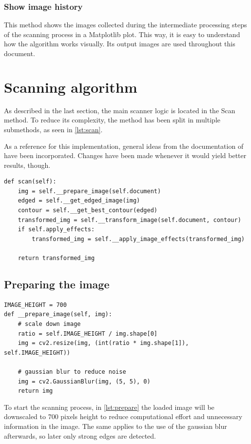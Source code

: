 \subsubsection*{Show image history}
This method shows the images collected during the intermediate processing steps of the scanning process in a Matplotlib plot. This way, it is easy to understand how the algorithm works visually. Its output images are used throughout this document.

\section{Scanning algorithm}
\label{main_logic}

As described in the last section, the main scanner logic is located in the Scan method. To reduce its complexity, the method has been split in multiple submethods, as seen in \autoref{lst:scan}.

As a reference for this implementation, general ideas from the documentation of \cite{scanner} have been incorporated. Changes have been made whenever it would yield better results, though.

\begin{lstlisting}[caption={Scan method}, label={lst:scan}]
def scan(self):
    img = self.__prepare_image(self.document)
    edged = self.__get_edged_image(img)
    contour = self.__get_best_contour(edged)
    transformed_img = self.__transform_image(self.document, contour)
    if self.apply_effects:
        transformed_img = self.__apply_image_effects(transformed_img)

    return transformed_img
\end{lstlisting}

\subsection{Preparing the image}
\begin{lstlisting}[caption={Prepare image method}, label={lst:prepare}]
IMAGE_HEIGHT = 700
def __prepare_image(self, img):
    # scale down image
    ratio = self.IMAGE_HEIGHT / img.shape[0]
    img = cv2.resize(img, (int(ratio * img.shape[1]), self.IMAGE_HEIGHT))

    # gaussian blur to reduce noise
    img = cv2.GaussianBlur(img, (5, 5), 0)
    return img
\end{lstlisting}
    
To start the scanning process, in \autoref{lst:prepare} the loaded image will be downscaled to 700 pixels height to reduce computational effort and unnecessary information in the image. The same applies to the use of the gaussian blur afterwards, so later only strong edges are detected.

